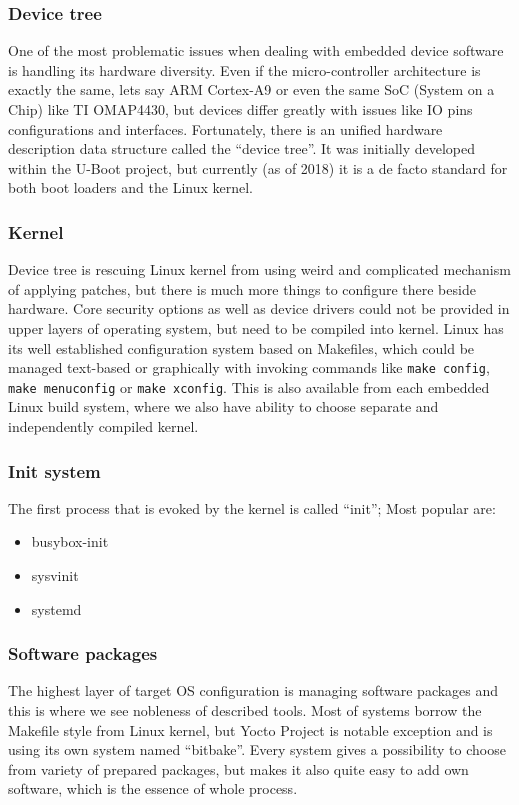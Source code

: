 \documentclass[printmode]{mgr}
\begin{document}
\subsubsection{Device tree}
One of the most problematic issues when dealing with embedded device software is handling its hardware diversity. Even if the micro-controller architecture is exactly the same, lets say ARM Cortex-A9 or even the same SoC (System on a Chip) like TI OMAP4430, but devices differ greatly with issues like IO pins configurations and interfaces. Fortunately, there is an unified hardware description data structure called the ``device tree''. It was initially developed within the U-Boot project, but currently (as of 2018) it is a de facto standard for both boot loaders and the Linux kernel.

\subsubsection{Kernel}
Device tree is rescuing Linux kernel from using weird and complicated mechanism of applying patches, but there is much more things to configure there beside hardware. Core security options as well as device drivers could not be provided in upper layers of operating system, but need to be compiled into kernel. Linux has its well established configuration system based on Makefiles, which could be managed text-based or graphically with invoking commands like \verb|make config|, \verb|make menuconfig| or \verb|make xconfig|. This is also available from each embedded Linux build system, where we also have ability to choose separate and independently compiled kernel.

\subsubsection{Init system}

The first process that is evoked by the kernel is called ``init''; Most popular are:

\begin{itemize}
    \item busybox-init
    \item sysvinit
    \item systemd
\end{itemize}

\subsubsection{Software packages}
The highest layer of target OS configuration is managing software packages and this is where we see nobleness of described tools. Most of systems borrow the Makefile style from Linux kernel, but Yocto Project is notable exception and is using its own system named ``bitbake''. Every system gives a possibility to choose from variety of prepared packages, but makes it also quite easy to add own software, which is the essence of whole process.
\end{document}
